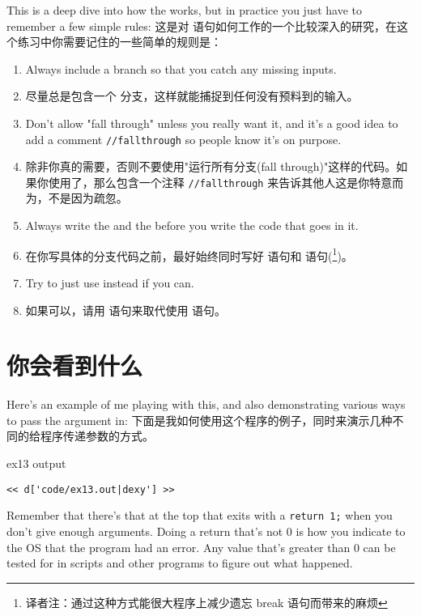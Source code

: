 This is a deep dive into how the  works, but
in practice you just have to remember a few simple rules:
这是对  语句如何工作的一个比较深入的研究，在这个练习中你需要记住的一些简单的规则是：
\begin{enumerate}
\item Always include a  branch so that you catch
    any missing inputs.
\item 尽量总是包含一个  分支，这样就能捕捉到任何没有预料到的输入。
\item Don't allow "fall through" unless you really want it, and
    it's a good idea to add a comment \verb|//fallthrough| so 
    people know it's on purpose.
\item 除非你真的需要，否则不要使用"运行所有分支(fall through)"这样的代码。如果你使用了，那么包含一个注释 \verb|//fallthrough| 来告诉其他人这是你特意而为，不是因为疏忽。
\item Always write the  and the  before
    you write the code that goes in it.
\item 在你写具体的分支代码之前，最好始终同时写好  语句和  语句(\footnote{译者注：通过这种方式能很大程序上减少遗忘 break 语句而带来的麻烦})。
\item Try to just use  instead if you can.
\item 如果可以，请用   语句来取代使用  语句。
\end{enumerate}

\section{你会看到什么}
Here's an example of me playing with this, and also demonstrating
various ways to pass the argument in:
下面是我如何使用这个程序的例子，同时来演示几种不同的给程序传递参数的方式。
\begin{code}{ex13 output}
\begin{lstlisting}
<< d['code/ex13.out|dexy'] >>
\end{lstlisting}
\end{code}

Remember that there's that  at the top that
exits with a \verb|return 1;| when you don't give enough arguments.
Doing a return that's not 0 is how you indicate to the OS that
the program had an error.  Any value that's greater than 0 can be
tested for in scripts and other programs to figure out what
happened.

